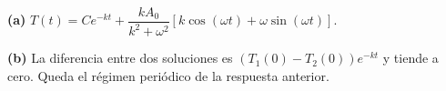\noindent\textbf{(a)} $T(t)=Ce^{-kt}+\dfrac{kA_0}{k^2+\omega^2}[k\cos(\omega t)+\omega\sin(\omega t)]$.

\noindent\textbf{(b)} La diferencia entre dos soluciones es $(T_1(0)-T_2(0))e^{-kt}$ y tiende a cero. Queda el régimen periódico de la respuesta anterior.
